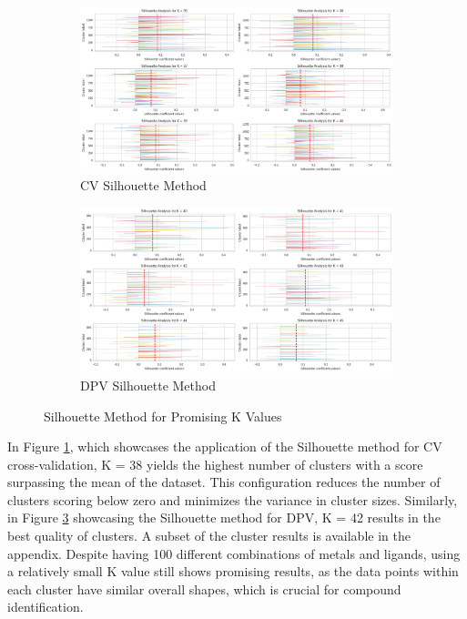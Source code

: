 \begin{figure}[!h]
  	\centering
  	\begin{subfigure}{1.0\textwidth}
    \includegraphics[width=1.0\textwidth]{figures/cv_silhouette.png}
    \caption{CV Silhouette Method}
    \label{cv_silhouette}
    \end{subfigure}
    
    \begin{subfigure}{1.0\textwidth}
    \includegraphics[width=1.0\textwidth]{figures/dpv_silhouette.png}
    \caption{DPV Silhouette Method}
    \label{dpv_silhouette}
    \end{subfigure}
    
    \caption{Silhouette Method for Promising K Values}
\end{figure}
In Figure \ref{cv_silhouette}, which showcases the application of the Silhouette method for CV cross-validation, K = 38 yields the highest number of clusters with a score surpassing the mean of the dataset. This configuration reduces the number of clusters scoring below zero and minimizes the variance in cluster sizes.
Similarly, in Figure \ref{dpv_silhouette} showcasing the Silhouette method for DPV, K = 42 results in the best quality of clusters. A subset of the cluster results is available in the appendix. Despite having 100 different combinations of metals and ligands, using a relatively small K value still shows promising results, as the data points within each cluster have similar overall shapes, which is crucial for compound identification. 

